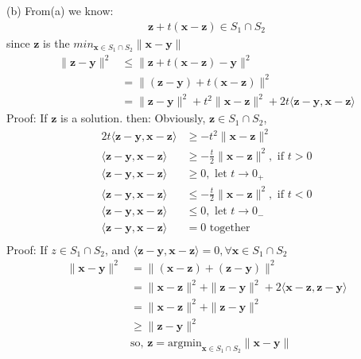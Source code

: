 \documentclass[a4paper,12pt]{article}
\begin{document}
(b)
From(a) we know:
\begin{align*}
    \bm{z} + t(\bm{x} - \bm{z}) \in S_1 \cap S_2
\end{align*}
since \(\bm{z}\) is the \(min_{\bm{x} \in S_1 \cap S_2} \|\bm{x} - \bm{y}\|\)
\begin{align*}
    \|\bm{z} - \bm{y}\|^2 &\leq \|\bm{z} + t(\bm{x} - \bm{z}) - \bm{y}\|^2 \\
    &= \|(\bm{z} - \bm{y}) + t(\bm{x} - \bm{z})\|^2 \\
    &= \|\bm{z} - \bm{y}\|^2 + t^2\|\bm{x} - \bm{z}\|^2 + 2t\langle \bm{z} - \bm{y}, \bm{x} - \bm{z}\rangle
\end{align*}
Proof: If \(\bm{z}\) is a solution. then:
Obviously, \(\bm{z} \in S_1 \cap S_2\), 
\begin{align*}
    2t\langle \bm{z} - \bm{y}, \bm{x} - \bm{z}\rangle &\geq - t^2 \|\bm{x} - \bm{z}\|^2  \\
    \langle \bm{z} - \bm{y}, \bm{x} - \bm{z}\rangle &\geq - \frac t 2 \|\bm{x} - \bm{z}\|^2 , \text{ if } t > 0\\
    \langle \bm{z} - \bm{y}, \bm{x} - \bm{z} \rangle &\geq 0, \text{ let }t \to 0_{+} \\
    \langle \bm{z} - \bm{y}, \bm{x} - \bm{z}\rangle &\leq - \frac t 2 \|\bm{x} - \bm{z}\|^2 , \text{ if } t < 0\\
    \langle \bm{z} - \bm{y}, \bm{x} - \bm{z} \rangle &\leq 0, \text{ let }t \to 0_{-} \\
    \langle \bm{z} - \bm{y}, \bm{x} - \bm{z} \rangle &= 0  \text{ together} \\
\end{align*}
Proof: If \(z \in S_1 \cap S_2\), and \(\langle \bm{z} - \bm{y}, \bm{x} - \bm{z} \rangle = 0, \forall \bm{x} \in S_1 \cap S_2\)
\begin{align*}
    \|\bm{x} - \bm{y} \|^2 &= \|(\bm{x} - \bm{z}) + (\bm{z} - \bm{y})\|^2 \\
    &= \|\bm{x} - \bm{z}\|^2 + \|\bm{z} - \bm{y}\|^2 + 2 \langle \bm{x} - \bm{z}, \bm{z} - \bm{y}\rangle \\
    &= \|\bm{x} - \bm{z}\|^2 + \|\bm{z} - \bm{y}\|^2 \\
    &\geq \|\bm{z} - \bm{y}\|^2 \\
    & \text{so, } \bm{z} = \text{argmin}_{\bm{x} \in S_1 \cap S_2} \|\bm{x} - \bm{y}\|
\end{align*}
\end{document}
